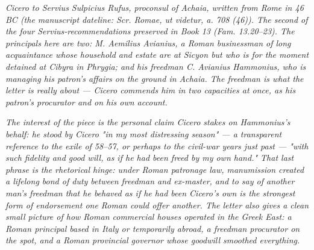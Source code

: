 
\textit{Cicero to Servius Sulpicius Rufus, proconsul of
Achaia, written from Rome in 46 BC (the manuscript
dateline: \textit{Scr. Romae, ut videtur, a. 708 (46)}).
The second of the four Servius-recommendations preserved
in Book 13 (Fam. 13.20--23). The principals here are
two: M. Aemilius Avianius, a Roman businessman of long
acquaintance whose household and estate are at Sicyon
but who is for the moment detained at Cibyra in
Phrygia; and his freedman C. Avianius Hammonius, who is
managing his patron's affairs on the ground in Achaia.
The freedman is what the letter is really about ---
Cicero commends him in two capacities at once, as his
patron's procurator and on his own account.}

\textit{The interest of the piece is the personal claim
Cicero stakes on Hammonius's behalf: he stood by Cicero
"in my most distressing season" --- a transparent
reference to the exile of 58--57, or perhaps to the
civil-war years just past --- "with such fidelity and
good will, as if he had been freed by my own hand."
That last phrase is the rhetorical hinge: under Roman
patronage law, manumission created a lifelong bond of
duty between freedman and ex-master, and to say of
another man's freedman that he behaved \textit{as if} he
had been Cicero's own is the strongest form of
endorsement one Roman could offer another. The letter
also gives a clean small picture of how Roman commercial
houses operated in the Greek East: a Roman principal
based in Italy or temporarily abroad, a freedman
procurator on the spot, and a Roman provincial governor
whose goodwill smoothed everything.}
